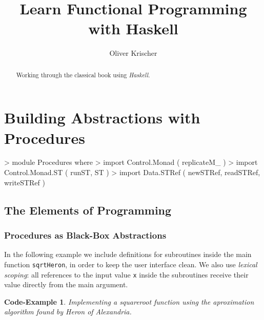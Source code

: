 \documentclass{scrartcl}
\newtheorem{impl}[defn]{Code-Example}
\numberwithin{equation}{section}
\begin{document}
\title{Learn Functional Programming with Haskell}
\author{Oliver Krischer}
\maketitle
\begin{abstract}
  Working through the classical book  \autocite{sicp96} using \emph{Haskell}.
\end{abstract}
\tableofcontents
\listoffigures

\section{Building Abstractions with Procedures}

\begin{haskellcode}

> module Procedures where
> import Control.Monad ( replicateM_ )
> import Control.Monad.ST ( runST, ST )
> import Data.STRef ( newSTRef, readSTRef, writeSTRef )

\end{haskellcode}

\subsection{The Elements of Programming}
\subsubsection{Procedures as Black-Box Abstractions}

In the following example we include definitions for subroutines inside the main function \texttt{sqrtHeron}, in order to keep the user interface clean.
We also use \emph{lexical scoping}: all references to the input value \texttt{x} inside the subroutines receive their value directly from the main argument.

\begin{impl}
Implementing a squareroot function using the aproximation algorithm found by Heron of Alexandria.
\end{impl}

\end{document}
